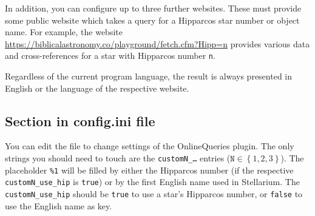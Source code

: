 In addition, you can configure up to three further websites. These
must provide some public website which takes a query for a Hipparcos
star number or object name.  For example, the website
\url{https://biblicalastronomy.co/playground/fetch.cfm?Hipp=n}
provides various data and cross-references for a star with Hipparcos
number \texttt{n}.

Regardless of the current program language, the result is always
presented in English or the language of the respective website.


\subsection{Section  in config.ini file}

You can edit the  file to change settings of the
OnlineQueries plugin.  The only strings you should need to touch are
the \texttt{customN\_\ldots} entries ($\mathtt{N}\in \left\{ 1, 2,
3\right\}$). The placeholder \texttt{\%1} will be filled by either the
Hipparcos number (if the respective \texttt{customN\_use\_hip} is
\texttt{true}) or by the first English name used in Stellarium. The
\texttt{customN\_use\_hip} should be \texttt{true} to use a star's
Hipparcos number, or \texttt{false} to use the English name as key.


